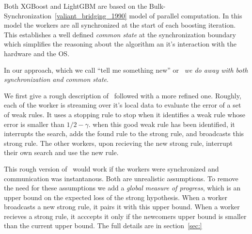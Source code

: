 Both XGBoost and LightGBM are based on the
Bulk-Synchronization~\ref{valiant_bridging_1990} model of parallel
computation. In this model the workers are all synchronized at the
start of each boosting iteration. This establishes a well defined {\em
  common state} at the synchronization boundary which simplifies the
reasoning about the algorithm an it's interaction with the hardware
and the OS.

In our approach, which we call ``tell me something new'' or
\tmsn\ {\em we do away with both synchronization and common state}.

We first give a rough description of \tmsn\, followed with a more
refined one. Roughly, each of the worker is streaming over it's local
data to evaluate the error of a set of weak rules. It uses a stopping
rule to stop when it identifies a weak rule whose error is smaller
than $1/2-\gamma$. when this good weak rule has been identified, it
interrupts the search, adds the found rule to the strong rule, and
broadcasts this strong rule. The other workers, upon recieving the new
strong rule, interrupt their own search and use the new rule.

This rough version of \tmsn\ would work if the workers were
synchronized and communication was instantanous. Both are unrealistic
assumptions. To remove the need for these assumptions we add a {\em
  global measure of progress}, which is an upper bound on the expected
loss of the strong hypothesis. When a worker broadcasts a new strong
rule, it pairs it with this upper bound. When a worker recieves a
strong rule, it acccepts it only if the newcomers upper bound is
smaller than the current upper bound. The full details are in
section~\ref{sec:}

